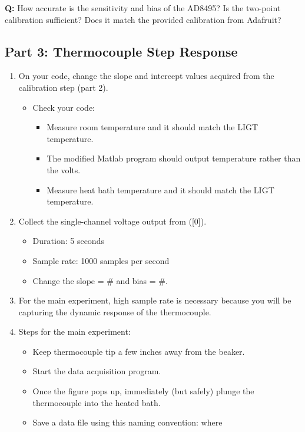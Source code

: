 \documentclass{article} %
\begin{document}
\textbf{Q:} How accurate is the sensitivity and bias of the AD8495? Is the two-point calibration sufficient? Does it match the provided calibration from Adafruit? \\

\subsection{Part 3: Thermocouple Step Response}
\begin{enumerate}
    \item On your  code, change the slope and intercept values acquired from the calibration step (part 2).  
    \begin{itemize}
        \item Check your code:
        \begin{itemize}
            \item Measure room temperature and it should match the LIGT temperature.
            \item The modified Matlab program should output temperature rather than the volts.
            \item Measure heat bath temperature and it should match the LIGT temperature.
        \end{itemize}
    \end{itemize}
    \item Collect the single-channel voltage output from ([0]).
    \begin{itemize}
        \item Duration: 5 seconds
        \item Sample rate: 1000 samples per second
        \item Change the slope = \# and bias = \#.
    \end{itemize}
    \item For the main experiment, high sample rate is necessary because you will be capturing the dynamic response of the thermocouple.
    \item Steps for the main experiment:
    \begin{itemize}
        \item Keep thermocouple tip a few inches away from the beaker.
        \item Start the data acquisition program.
        \item Once the figure pops up, immediately (but safely) plunge the thermocouple into the heated bath.
        \item Save a data file using this naming convention:  where

\end{itemize}
\end{enumerate}
\end{document}
